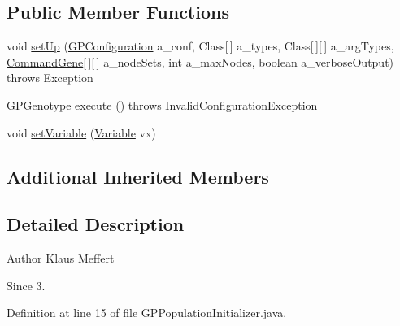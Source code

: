 \subsection*{Public Member Functions}
\begin{DoxyCompactItemize}
\item 
void \hyperlink{classexamples_1_1grid_1_1math_problem_distributed_1_1_g_p_population_initializer_aef14ed8828f9cae68ae73d6f0f86c20d}{set\-Up} (\hyperlink{classorg_1_1jgap_1_1gp_1_1impl_1_1_g_p_configuration}{G\-P\-Configuration} a\-\_\-conf, Class\mbox{[}$\,$\mbox{]} a\-\_\-types, Class\mbox{[}$\,$\mbox{]}\mbox{[}$\,$\mbox{]} a\-\_\-arg\-Types, \hyperlink{classorg_1_1jgap_1_1gp_1_1_command_gene}{Command\-Gene}\mbox{[}$\,$\mbox{]}\mbox{[}$\,$\mbox{]} a\-\_\-node\-Sets, int a\-\_\-max\-Nodes, boolean a\-\_\-verbose\-Output)  throws Exception 
\item 
\hyperlink{classorg_1_1jgap_1_1gp_1_1impl_1_1_g_p_genotype}{G\-P\-Genotype} \hyperlink{classexamples_1_1grid_1_1math_problem_distributed_1_1_g_p_population_initializer_a55ac54b538bfa57304d1328461ca780e}{execute} ()  throws Invalid\-Configuration\-Exception 
\item 
void \hyperlink{classexamples_1_1grid_1_1math_problem_distributed_1_1_g_p_population_initializer_ab1a3c15372220e697ca566d724c04d8e}{set\-Variable} (\hyperlink{classorg_1_1jgap_1_1gp_1_1terminal_1_1_variable}{Variable} vx)
\end{DoxyCompactItemize}
\subsection*{Additional Inherited Members}


\subsection{Detailed Description}
\begin{DoxyAuthor}{Author}
Klaus Meffert 
\end{DoxyAuthor}
\begin{DoxySince}{Since}
3. 
\end{DoxySince}


Definition at line 15 of file G\-P\-Population\-Initializer.\-java.



